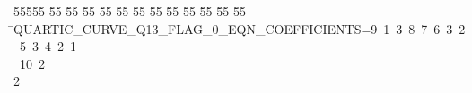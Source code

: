 %
%
\begin{tabbing}
55555 \= 55 \= 55 \= 55 \= 55 \= 55 \= 55 \= 55 \= 55 \= 55 \= 55 \= 55 \= 55 \= \>QUARTIC\_CURVE\_Q13\_FLAG\_0\_EQN\_COEFFICIENTS=9\ 1\ 3\ 8\ 7\ 6\ 3\ 2\ 5\ 3\ 4\ 2\ 1\\[0pt]
\>\ 10\ 2\\[0pt]
2\>\end{tabbing}

